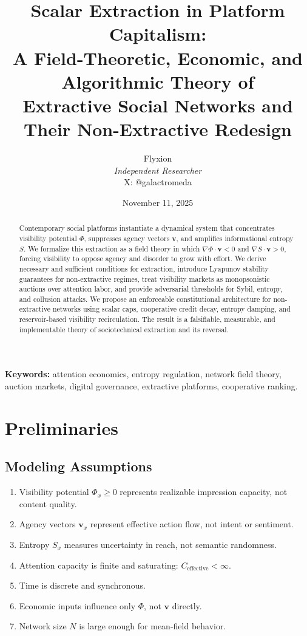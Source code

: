 \documentclass[11pt,a4paper]{article}
\title{\Huge Scalar Extraction in Platform Capitalism:\\
        \Large A Field-Theoretic, Economic, and Algorithmic Theory of\\
        Extractive Social Networks and Their Non-Extractive Redesign}
\author{Flyxion\\[6pt]\textit{Independent Researcher}\\X: @galactromeda}
\date{November 11, 2025}
\theoremstyle{plain}
\theoremstyle{definition}
\theoremstyle{remark}
\newcommand{\vvec}{\mathbf{v}}
\newcommand{\Entropy}{S}
\begin{document}
\maketitle

\begin{abstract}
Contemporary social platforms instantiate a dynamical system that concentrates visibility potential $\Phi$, suppresses agency vectors $\vvec$, and amplifies informational entropy $\Entropy$. 
We formalize this extraction as a field theory in which $\nabla\Phi \cdot \vvec < 0$ and $\nabla \Entropy \cdot \vvec > 0$, forcing visibility to oppose agency and disorder to grow with effort. 
We derive necessary and sufficient conditions for extraction, introduce Lyapunov stability guarantees for non-extractive regimes, treat visibility markets as monopsonistic auctions over attention labor, and provide adversarial thresholds for Sybil, entropy, and collusion attacks. 
We propose an enforceable constitutional architecture for non-extractive networks using scalar caps, cooperative credit decay, entropy damping, and reservoir-based visibility recirculation. 
The result is a falsifiable, measurable, and implementable theory of sociotechnical extraction and its reversal.
\end{abstract}

\noindent\textbf{Keywords:} attention economics, entropy regulation, network field theory, auction markets, digital governance, extractive platforms, cooperative ranking.

\tableofcontents
\newpage


\section*{Preliminaries}

\subsection{Modeling Assumptions}

\begin{enumerate}
  \item Visibility potential $\Phi_x \ge 0$ represents realizable impression capacity, not content quality.
  \item Agency vectors $\vvec_x$ represent effective action flow, not intent or sentiment.
  \item Entropy $\Entropy_x$ measures uncertainty in reach, not semantic randomness.
  \item Attention capacity is finite and saturating: $C_{\text{effective}} < \infty$.
  \item Time is discrete and synchronous.
  \item Economic inputs influence only $\Phi$, not $\vvec$ directly.
  \item Network size $N$ is large enough for mean-field behavior.
\end{enumerate}
\end{document}
